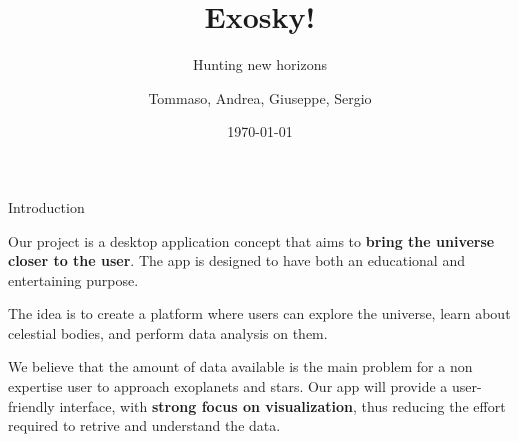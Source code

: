 \documentclass[9pt]{beamer}
\title{Exosky!}
\subtitle{Hunting new horizons}
\date{\today}
\author{Tommaso, Andrea, Giuseppe, Sergio}
\institute{Giovio Team}
\begin{document}
\maketitle

\begin{frame}{Introduction}

    Our project is a desktop application concept that aims to \textbf{bring the universe closer to the user}.
    The app is designed to have both an educational and entertaining purpose.

    The idea is to create a platform where users can explore the universe, learn about celestial bodies, and perform data analysis on them.

    We believe that the amount of data available is the main problem for a non expertise user to approach exoplanets and stars.
    Our app will provide a user-friendly interface, with \textbf{strong focus on visualization}, thus reducing the effort required to retrive and understand the data.

\end{frame}
\end{document}
